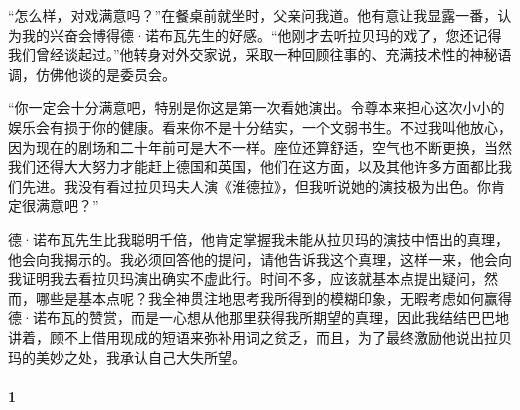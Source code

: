 \par “怎么样，对戏满意吗？”在餐桌前就坐时，父亲问我道。他有意让我显露一番，认为我的兴奋会博得德·诺布瓦先生的好感。“他刚才去听拉贝玛的戏了，您还记得我们曾经谈起过。”他转身对外交家说，采取一种回顾往事的、充满技术性的神秘语调，仿佛他谈的是委员会。
\par “你一定会十分满意吧，特别是你这是第一次看她演出。令尊本来担心这次小小的娱乐会有损于你的健康。看来你不是十分结实，一个文弱书生。不过我叫他放心，因为现在的剧场和二十年前可是大不一样。座位还算舒适，空气也不断更换，当然我们还得大大努力才能赶上德国和英国，他们在这方面，以及其他许多方面都比我们先进。我没有看过拉贝玛夫人演《淮德拉》，但我听说她的演技极为出色。你肯定很满意吧？”
\par 德·诺布瓦先生比我聪明千倍，他肯定掌握我未能从拉贝玛的演技中悟出的真理，他会向我揭示的。我必须回答他的提问，请他告诉我这个真理，这样一来，他会向我证明我去看拉贝玛演出确实不虚此行。时间不多，应该就基本点提出疑问，然而，哪些是基本点呢？我全神贯注地思考我所得到的模糊印象，无暇考虑如何赢得德·诺布瓦的赞赏，而是一心想从他那里获得我所期望的真理，因此我结结巴巴地讲着，顾不上借用现成的短语来弥补用词之贫乏，而且，为了最终激励他说出拉贝玛的美妙之处，我承认自己大失所望。


\paragraph*{1}

